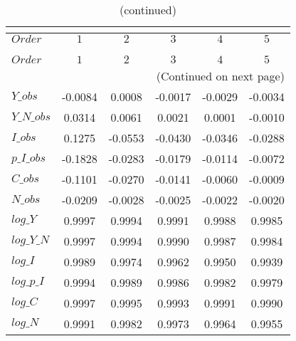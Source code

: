  
\begin{center}
\begin{longtable}{lccccc} 
\caption{COEFFICIENTS OF AUTOCORRELATION}\\
 \label{Table:th_autocorr_matrix}\\
\toprule 
$Order      $	 & 	 $          1$	 & 	 $          2$	 & 	 $          3$	 & 	 $          4$	 & 	 $          5$\\
\midrule \endfirsthead 
\caption{(continued)}\\
 \toprule \\ 
$Order      $	 & 	 $          1$	 & 	 $          2$	 & 	 $          3$	 & 	 $          4$	 & 	 $          5$\\
\midrule \endhead 
\midrule \multicolumn{6}{r}{(Continued on next page)} \\ \bottomrule \endfoot 
\bottomrule \endlastfoot 
$Y\_obs     $	 & 	    -0.0084	 & 	     0.0008	 & 	    -0.0017	 & 	    -0.0029	 & 	    -0.0034 \\ 
$Y\_N\_obs  $	 & 	     0.0314	 & 	     0.0061	 & 	     0.0021	 & 	     0.0001	 & 	    -0.0010 \\ 
$I\_obs     $	 & 	     0.1275	 & 	    -0.0553	 & 	    -0.0430	 & 	    -0.0346	 & 	    -0.0288 \\ 
$p\_I\_obs  $	 & 	    -0.1828	 & 	    -0.0283	 & 	    -0.0179	 & 	    -0.0114	 & 	    -0.0072 \\ 
$C\_obs     $	 & 	    -0.1101	 & 	    -0.0270	 & 	    -0.0141	 & 	    -0.0060	 & 	    -0.0009 \\ 
$N\_obs     $	 & 	    -0.0209	 & 	    -0.0028	 & 	    -0.0025	 & 	    -0.0022	 & 	    -0.0020 \\ 
$log\_Y     $	 & 	     0.9997	 & 	     0.9994	 & 	     0.9991	 & 	     0.9988	 & 	     0.9985 \\ 
$log\_Y\_N  $	 & 	     0.9997	 & 	     0.9994	 & 	     0.9990	 & 	     0.9987	 & 	     0.9984 \\ 
$log\_I     $	 & 	     0.9989	 & 	     0.9974	 & 	     0.9962	 & 	     0.9950	 & 	     0.9939 \\ 
$log\_p\_I  $	 & 	     0.9994	 & 	     0.9989	 & 	     0.9986	 & 	     0.9982	 & 	     0.9979 \\ 
$log\_C     $	 & 	     0.9997	 & 	     0.9995	 & 	     0.9993	 & 	     0.9991	 & 	     0.9990 \\ 
$log\_N     $	 & 	     0.9991	 & 	     0.9982	 & 	     0.9973	 & 	     0.9964	 & 	     0.9955 \\ 
\end{longtable}
 \end{center}
